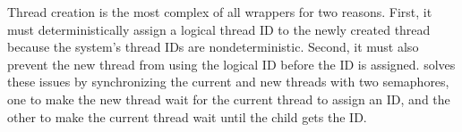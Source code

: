 


Thread creation is the most complex of all wrappers for two reasons.
First, it must deterministically assign a logical thread ID
to the newly created thread because the system's thread IDs are
nondeterministic.  Second, it must also prevent the new thread from using
the logical ID before the ID is assigned.  \parrot solves these issues by
synchronizing the current and new threads with two semaphores, one to make
the new thread wait for the current thread to assign an ID, and the other to
make the current thread wait until the child gets the ID.


